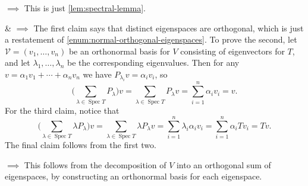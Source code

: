 \documentclass[a4paper, 11pt]{memoir}
\numberwithin{equation}{chapter}
\newcommand{\calV}{\mathcal{V}}
\DeclareMathOperator{\spec}{Spec}
\begin{document}
\begin{proofof}
\begin{proofsec*}
    \item[\Namesubcref{enum:spectral-selfadjoint-normal} $\implies$ \namesubcref{enum:spectral-orthogonally-diagonalisable}]
    This is just \cref{lem:spectral-lemma}.

    \item[\Namesubcref{enum:spectral-selfadjoint-normal} \& \namesubcref{enum:spectral-orthogonally-diagonalisable} $\implies$ \namesubcref{enum:spectral-operator-decomposition}]
    The first claim says that distinct eigenspaces are orthogonal, which is just a restatement of \cref{enum:normal-orthogonal-eigenspaces}. To prove the second, let $\calV = (v_1, \ldots, v_n)$ be an orthonormal basis for $V$ consisting of eigenvectors for $T$, and let $\lambda_1, \ldots, \lambda_n$ be the corresponding eigenvalues. Then for any $v = \alpha_1 v_1 + \cdots + \alpha_n v_n$ we have $P_{\lambda_i} v = \alpha_i v_i$, so
    \begin{equation*}
        \biggl( \sum_{\lambda \in \spec T} P_\lambda \biggr) v
            = \sum_{\lambda \in \spec T} P_\lambda v
            = \sum_{i=1}^n \alpha_i v_i
            = v.
    \end{equation*}
    For the third claim, notice that
    \begin{equation*}
        \biggl( \sum_{\lambda \in \spec T} \lambda P_\lambda \biggr) v
            = \sum_{\lambda \in \spec T} \lambda P_\lambda v
            = \sum_{i=1}^n \lambda_i \alpha_i v_i
            = \sum_{i=1}^n \alpha_i Tv_i
            = Tv.
    \end{equation*}
    The final claim follows from the first two.

    \item[\Namesubcref{enum:spectral-operator-decomposition} $\implies$ \namesubcref{enum:spectral-orthogonally-diagonalisable}]
    This follows from the decomposition of $V$ into an orthogonal sum of eigenspaces, by constructing an orthonormal basis for each eigenspace.


\end{proofsec*}
\end{proofof}
\end{document}
